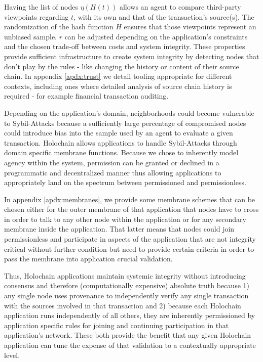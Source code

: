 \documentclass[twocolumn,showpacs,
  nofootinbib,aps,superscriptaddress,
  eqsecnum,prd,notitlepage,showkeys,10pt]{revtex4-1}
\begin{document}
Having the list of nodes $\eta(H(t))$ allows an agent to compare third-party viewpoints regarding $t$, with its own and that of the transaction's source(s).
The randomization of the hash function $H$ ensures that those viewpoints represent
an unbiased sample.
$r$ can be adjusted depending on the application's constraints and the chosen trade-off between costs and system integrity.
These properties provide sufficient infrastructure to create system integrity
by detecting nodes that don't play by the rules - like changing the history or
content of their source chain.
In appendix \ref{apdx:trust} we detail tooling appropriate for different contexts,
including ones where detailed analysis of source chain history is required -
for example financial transaction auditing.

Depending on the application's domain, neighborhoods could become vulnerable to Sybil-Attacks because a sufficiently large percentage of compromised nodes could introduce bias into the sample used by an agent to evaluate a given transaction.
Holochain allows applications to handle Sybil-Attacks through domain specific
membrane functions.
Because we chose to inherently model agency within the system,
permission can be granted or declined in a programmatic and decentralized manner
thus allowing applications to appropriately land on the spectrum between permissioned and permissionless.

In appendix \ref{apdx:membranes}, we provide some membrane schemes that can be
chosen either for the outer
membrane of that application that nodes have to cross in order to talk to
any other node within the application or for any secondary membrane inside
the application.
That latter means that nodes could join permissionless and participate in aspects
of the application that are not integrity critical without further condition
but need to provide certain criteria in order to pass the membrane into application crucial
validation.

Thus, Holochain applications maintain systemic integrity without introducing
consensus and therefore (computationally expensive) absolute truth because 1) any single node uses provenance to independently verify any single transaction with the sources involved in that transaction and 2) because each Holochain application runs independently of all others, they are inherently permissioned by application specific rules for joining and continuing participation in that application's network.
These both provide the benefit that any given Holochain application can tune the expense of that validation to a contextually appropriate level.
\end{document}
